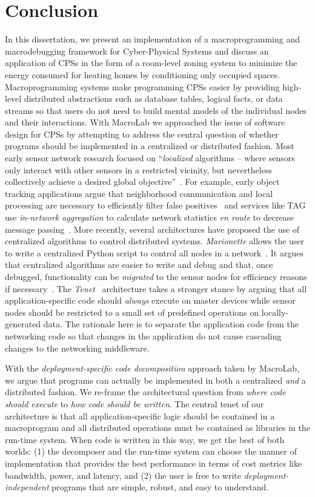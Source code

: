 \chapter{Conclusion}
\label{sect:conclusion}

In this dissertation, we present an implementation of a macroprogramming and
macrodebugging framework for Cyber-Physical Systems and discuss an application
of CPSs in the form of a room-level zoning system to
minimize the energy consumed for heating homes by conditioning only occupied
spaces. Macroprogramming systems make programming CPSs easier by providing high-level
distributed abstractions such as database tables, logical facts, or data streams
so that users do not need to build mental models of the individual nodes
and their interactions. With MacroLab we approached the issue of software design
for CPSs by attempting to address the central question of whether programs
should be implemented in a centralized or distributed fashion. Most early sensor
network research focused on ``{\em localized} algorithms -- where sensors only
interact with other sensors in a restricted vicinity, but nevertheless
collectively achieve a desired global objective''~\cite{Estrin}.  For
example, early object tracking applications argue that neighborhood
communication and local processing are necessary to efficiently filter false
positives~\cite{Whitehousea} and services like TAG use {\em
in-network aggregation} to calculate network statistics {\em en route} to
decrease message passing~\cite{Madden}.  More recently, several
architectures have proposed the use of centralized algorithms to control
distributed systems. {\em Marionette} allows the user to write a
centralized Python script to control all nodes in a
network~\cite{Whitehouseb}.  It argues that centralized algorithms are
easier to write and debug and that, once debugged, functionality can be {\em
migrated} to the sensor nodes for efficiency reasons if
necessary~\cite{Whitehouse}. The {\em Tenet}~\cite{Gnawali} architecture
takes a stronger stance by arguing that all application-specific code should
{\em always} execute on master devices while sensor nodes should be restricted
to a small set of predefined operations on locally-generated data. The rationale
here is to separate the application code from the networking code so that
changes in the application do not cause cascading changes to the networking
middleware.

With the {\em deployment-specific code decomposition} approach taken by
MacroLab, we argue that programs can actually be implemented in both a
centralized {\em and} a distributed fashion.  We re-frame the architectural
question from {\em where code should execute} to {\em how code should be
  written}.  The central tenet of our architecture is that all
application-specific logic should be contained in a macroprogram and all
distributed operations must be contained as libraries in the run-time system.
When code is written in this way, we get the best of both worlds: (1) the
decomposer and the run-time system can choose the manner of implementation that
provides the best performance in terms of cost metrics like bandwidth, power,
and latency, and (2) the user is free to write {\em deployment-independent}
programs that are simple, robust, and easy to understand.

